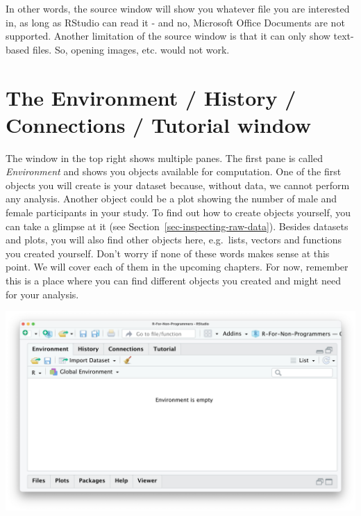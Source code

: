 \documentclass[
  letterpaper,
  DIV=11,
  numbers=noendperiod]{scrreprt}
\begin{document}
In other words, the source window will show you whatever file you are
interested in, as long as RStudio can read it - and no, Microsoft Office
Documents are not supported. Another limitation of the source window is
that it can only show text-based files. So, opening images, etc. would
not work.

\section{The Environment / History / Connections / Tutorial
window}\label{sec-the-environment-history-connections-tutorial-window}

The window in the top right shows multiple panes. The first pane is
called \emph{Environment} and shows you objects available for
computation. One of the first objects you will create is your dataset
because, without data, we cannot perform any analysis. Another object
could be a plot showing the number of male and female participants in
your study. To find out how to create objects yourself, you can take a
glimpse at it (see Section~\ref{sec-inspecting-raw-data}). Besides
datasets and plots, you will also find other objects here, e.g.~lists,
vectors and functions you created yourself. Don't worry if none of these
words makes sense at this point. We will cover each of them in the
upcoming chapters. For now, remember this is a place where you can find
different objects you created and might need for your analysis.

\includegraphics{images/chapter_04_img/04_environment_history_etc/01_rstudio_environment.png}
\end{document}

